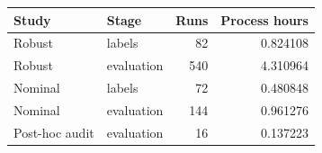 \begin{tabular}{llrr}
\toprule
Study & Stage & Runs & Process hours \\
\midrule
Robust & labels & 82 & 0.824108 \\
Robust & evaluation & 540 & 4.310964 \\
Nominal & labels & 72 & 0.480848 \\
Nominal & evaluation & 144 & 0.961276 \\
Post-hoc audit & evaluation & 16 & 0.137223 \\
\bottomrule
\end{tabular}
